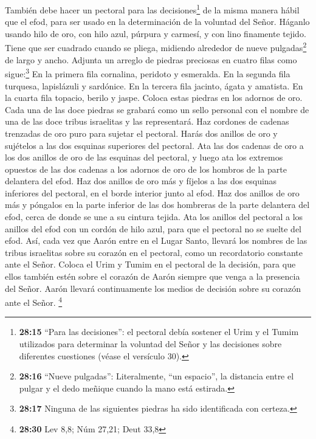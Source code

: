  También debe hacer un pectoral para las
decisiones\footnote{\textbf{28:15} ``Para las decisiones'': el pectoral
  debía sostener el Urim y el Tumim utilizados para determinar la
  voluntad del Señor y las decisiones sobre diferentes cuestiones (véase
  el versículo 30).} de la misma manera hábil que el efod, para ser
usado en la determinación de la voluntad del Señor. Háganlo usando hilo
de oro, con hilo azul, púrpura y carmesí, y con lino finamente tejido.
 Tiene que ser cuadrado cuando se pliega, midiendo
alrededor de nueve pulgadas\footnote{\textbf{28:16} ``Nueve pulgadas'':
  Literalmente, ``un espacio'', la distancia entre el pulgar y el dedo
  meñique cuando la mano está estirada.} de largo y ancho.
 Adjunta un arreglo de piedras preciosas en cuatro filas
como sigue:\footnote{\textbf{28:17} Ninguna de las siguientes piedras ha
  sido identificada con certeza.} En la primera fila cornalina, peridoto
y esmeralda.  En la segunda fila turquesa, lapislázuli y
sardónice.  En la tercera fila jacinto, ágata y amatista.
 En la cuarta fila topacio, berilo y jaspe. Coloca estas
piedras en los adornos de oro.  Cada una de las doce
piedras se grabará como un sello personal con el nombre de una de las
doce tribus israelitas y las representará.  Haz cordones
de cadenas trenzadas de oro puro para sujetar el pectoral.
 Harás dos anillos de oro y sujételos a las dos esquinas
superiores del pectoral.  Ata las dos cadenas de oro a
los dos anillos de oro de las esquinas del pectoral,  y
luego ata los extremos opuestos de las dos cadenas a los adornos de oro
de los hombros de la parte delantera del efod.  Haz dos
anillos de oro más y fíjelos a las dos esquinas inferiores del pectoral,
en el borde interior junto al efod.  Haz dos anillos de
oro más y póngalos en la parte inferior de las dos hombreras de la parte
delantera del efod, cerca de donde se une a su cintura tejida.
 Ata los anillos del pectoral a los anillos del efod con
un cordón de hilo azul, para que el pectoral no se suelte del efod.
 Así, cada vez que Aarón entre en el Lugar Santo, llevará
los nombres de las tribus israelitas sobre su corazón en el pectoral,
como un recordatorio constante ante el Señor.  Coloca el
Urim y Tumim en el pectoral de la decisión, para que ellos también estén
sobre el corazón de Aarón siempre que venga a la presencia del Señor.
Aarón llevará continuamente los medios de decisión sobre su corazón ante
el Señor. \footnote{\textbf{28:30} Lev 8,8; Núm 27,21; Deut 33,8}

